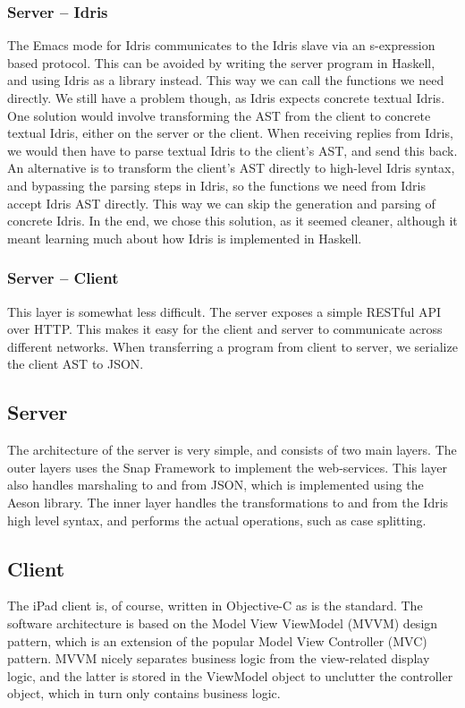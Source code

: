\subsubsection{Server -- Idris}
The Emacs mode for Idris communicates to the Idris slave via an s-expression
based protocol. This can be avoided by writing the server program in
Haskell, and using Idris as a library instead. This way we can call the
functions we need directly. We still have a problem though, as Idris expects
concrete textual Idris. One solution would involve transforming the AST from 
the client to concrete textual Idris, either on the server or the client. When
receiving replies from Idris, we would then have to parse textual Idris to the
client's AST\@, and send this back. An alternative is to transform the 
client's AST directly to high-level Idris syntax, and bypassing the parsing
steps in Idris, so the functions we need from Idris accept Idris AST directly.
This way we can skip the generation and parsing of concrete Idris. In the end,
we chose this solution, as it seemed cleaner, although it meant learning much
about how Idris is implemented in Haskell.

\subsubsection{Server -- Client}
This layer is somewhat less difficult. The server exposes a simple RESTful API 
over HTTP\@. This makes it easy for the client and server to communicate across
different networks. When transferring a program from client to server, we
serialize the client AST to JSON\@.

\subsection{Server}
The architecture of the server is very simple, and consists of two main 
layers. The outer layers uses the Snap Framework to implement the 
web-services. This layer also handles marshaling to and from JSON\@, which is 
implemented using the Aeson library. The inner layer handles the 
transformations to and from the Idris high level syntax, and performs the 
actual operations, such as case splitting.


\subsection{Client}
The iPad client is, of course, written in Objective-C as is the standard. The
software architecture is based on the Model View ViewModel (MVVM) design 
pattern, which is an extension of the popular Model View Controller 
(MVC) pattern. MVVM nicely separates business logic from the view-related
display logic, and the latter is stored in the ViewModel object to unclutter 
the controller object, which in turn only contains business logic.

